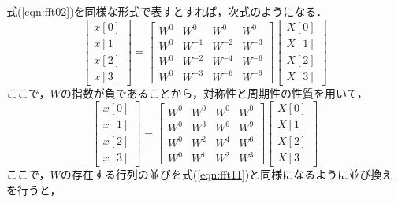 式(\ref{eqn:fft02})を同様な形式で表すとすれば，次式のようになる．
\begin{equation}
\begin{bmatrix}
x[0] \\
x[1] \\
x[2] \\
x[3]
\end{bmatrix}
=
\begin{bmatrix}
W^0 & W^0 & W^0 & W^0 \\
W^0 & W^{-1} & W^{-2} & W^{-3} \\
W^0 & W^{-2} & W^{-4} & W^{-6} \\
W^0 & W^{-3} & W^{-6} & W^{-9}
\end{bmatrix}
\begin{bmatrix}
X[0] \\
X[1] \\
X[2] \\
X[3]
\end{bmatrix}
\label{eqn:fft12}
\end{equation}
ここで，$W$の指数が負であることから，対称性と周期性の性質を用いて，
\begin{equation}
\begin{bmatrix}
x[0] \\
x[1] \\
x[2] \\
x[3]
\end{bmatrix}
=
\begin{bmatrix}
W^0 & W^0 & W^0 & W^0 \\
W^0 & W^{3} & W^{6} & W^{9} \\
W^0 & W^{2} & W^{4} & W^{6} \\
W^0 & W^{1} & W^{2} & W^{3}
\end{bmatrix}
\begin{bmatrix}
X[0] \\
X[1] \\
X[2] \\
X[3]
\end{bmatrix}
\label{eqn:fft13}
\end{equation}
ここで，$W$の存在する行列の並びを式(\ref{eqn:fft11})と同様になるように並び換えを行うと，
